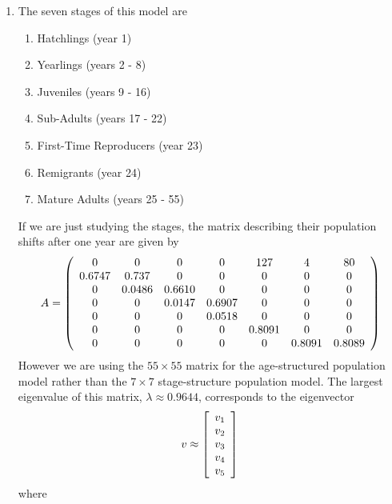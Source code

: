 \documentclass{article} %
\theoremstyle{plain}
\numberwithin{equation}{section} %
\numberwithin{figure}{section} %
\numberwithin{table}{section} %
\begin{document}
\begin{enumerate}[\ \ (a)]
    \item
        The seven stages of this model are
        \begin{enumerate}
            \item Hatchlings (year 1)
            \item Yearlings (years 2 - 8)
            \item Juveniles (years 9 - 16)
            \item Sub-Adults (years 17 - 22)
            \item First-Time Reproducers (year 23)
            \item Remigrants (year 24)
            \item Mature Adults (years 25 - 55)
        \end{enumerate}
        If we are just studying the stages, the matrix describing their population shifts after one year are given by
        \begin{align*}
            A = \qty(\begin{array}{ccccccc}
                0 & 0 & 0 & 0 & 127 & 4 & 80 \\
                0.6747 & 0.737 & 0 & 0 & 0 & 0 & 0 \\
                0 & 0.0486 & 0.6610 & 0 & 0 & 0 & 0 \\
                0 & 0 & 0.0147 & 0.6907 & 0 & 0 & 0 \\
                0 & 0 & 0 & 0.0518 & 0 & 0 & 0 \\
                0 & 0 & 0 & 0 & 0.8091 & 0 & 0 \\
                0 & 0 & 0 & 0 & 0 & 0.8091 & 0.8089
            \end{array})
        \end{align*}
        However we are using the $55\times55$ matrix for the age-structured population model rather than the $7\times7$ stage-structure population model.  The largest eigenvalue of this matrix, $\lambda \approx 0.9644$, corresponds to the eigenvector
        \begin{align*}
            v \approx \qty[\begin{array}{c} v_1 \\ v_2 \\ v_3 \\ v_4 \\ v_5 \end{array}]
        \end{align*}
        where
        \begin{align}

\end{align}
\end{enumerate}
\end{document}
